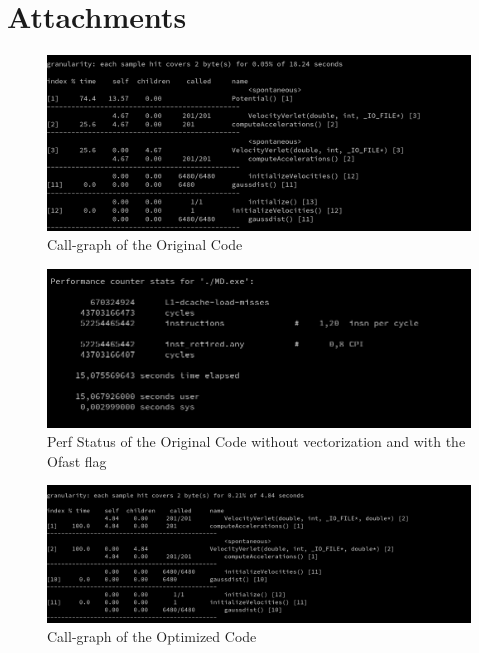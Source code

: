 \documentclass[conference]{IEEEtran}
\begin{document}
\onecolumn

\section*{Attachments}

\begin{figure}[htbp]
\includegraphics[scale=0.45]{images/gprof_O2_origina_CallGraohl.png}
\caption{Call-graph of the Original Code}
\label{fig}
\end{figure}

\begin{figure}[htbp]
\includegraphics[scale=0.6]{images/Bad_code_no_vect.png}
\caption{Perf Status of the Original Code without vectorization and with the Ofast flag}
\label{fig}
\end{figure}

\begin{figure}[htbp]
\includegraphics[scale=0.45]{images/Call_graf_latest.png}
\caption{Call-graph of the Optimized Code}
\label{fig}
\end{figure}
\end{document}
